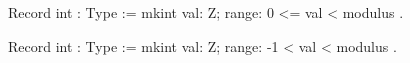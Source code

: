 Record int : Type :=
  mkint {
    val: Z;
    range: 0 <= val < modulus
  }.

Record int : Type :=
  mkint {
    val: Z;
    range: -1 < val < modulus
  }.
